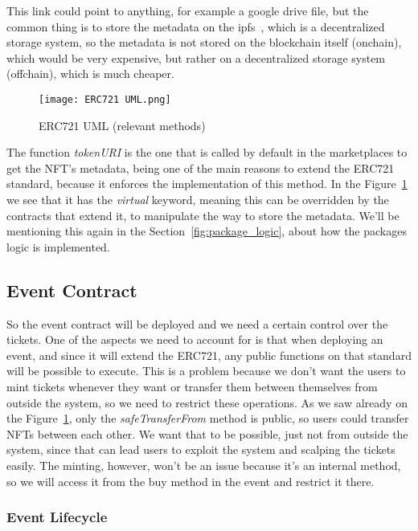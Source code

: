 This link could point to anything, for example a google drive file, but the
common thing is to store the metadata on the \gls{ipfs}~\cite{ipfs}, which is a
decentralized storage system, so the metadata is not stored on the blockchain
itself (onchain), which would be very expensive, but rather on a decentralized
storage system (offchain), which is much cheaper.

\begin{figure}[H]
	\texttt{[image: ERC721 UML.png]}
	\centering
	\caption{ERC721 UML (relevant methods)}\label{fig:erc721_uml}
\end{figure}

The function \textit{tokenURI} is the one that is called by default in the
marketplaces to get the NFT's metadata, being one of the main reasons to extend
the ERC721 standard, because it enforces the implementation of this method. In
the Figure~\ref{fig:erc721_uml} we see that it has the \textit{virtual}
keyword, meaning this can be overridden by the contracts that extend it, to
manipulate the way to store the metadata. We'll be mentioning this again in the
Section~\ref{fig:package_logic}, about how the packages logic is implemented.

\subsection{Event Contract}\label{subsec:event_contract}

So the event contract will be deployed and we need a certain control over the
tickets. One of the aspects we need to account for is that when deploying an
event, and since it will extend the ERC721, any public functions on that
standard will be possible to execute. This is a problem because we don't want
the users to mint tickets whenever they want or transfer them between
themselves from outside the system, so we need to restrict these operations. As
we saw already on the Figure~\ref{fig:erc721_uml}, only the
\textit{safeTransferFrom} method is public, so users could transfer NFTs
between each other. We want that to be possible, just not from outside the
system, since that can lead users to exploit the system and scalping the
tickets easily. The minting, however, won't be an issue because it's an
internal method, so we will access it from the buy method in the event and
restrict it there.

\subsubsection{Event Lifecycle}\label{subsubsec:event_lifecycle}

